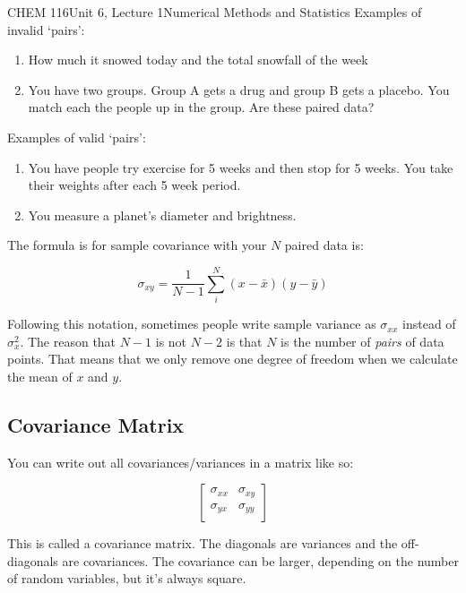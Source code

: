 \documentclass{article}
\begin{document}
\begin{tdoc}{CHEM 116}{Unit 6, Lecture 1}{Numerical Methods and Statistics}
Examples of invalid `pairs':

\begin{enumerate}

\item How much it snowed today and the total snowfall of the week

\item You have two groups. Group A gets a drug and group B gets a
  placebo. You match each the people up in the group. Are these paired data?

\end{enumerate}

Examples of valid `pairs':

\begin{enumerate}

  \item You have people try exercise for 5 weeks and then stop for 5
    weeks. You take their weights after each 5 week period. 

    \item You measure a planet's diameter and brightness.

\end{enumerate}


The formula is for sample covariance with your $N$ paired data is:

\begin{equation}
  \sigma_{xy}= \frac{1}{N - 1} \sum_i^N (x - \bar{x})(y - \bar{y})  
\end{equation}

Following this notation, sometimes people write sample variance as
$\sigma_{xx}$ instead of $\sigma_x^2$. The reason that $N - 1$ is not
$N - 2$ is that $N$ is the number of {\it pairs} of data points. That
means that we only remove one degree of freedom when we calculate the
mean of $x$ and $y$.

\subsection{Covariance Matrix}

You can write out all covariances/variances in a matrix like so:

\[
\left[\begin{array}{lr}
\sigma_{xx} & \sigma_{xy}\\
\sigma_{yx} & \sigma_{yy}\\
  \end{array}\right]
\]

This is called a covariance matrix. The diagonals are variances and
the off-diagonals are covariances. The covariance can be larger,
depending on the number of random variables, but it's always square.



\end{tdoc}
\end{document}
